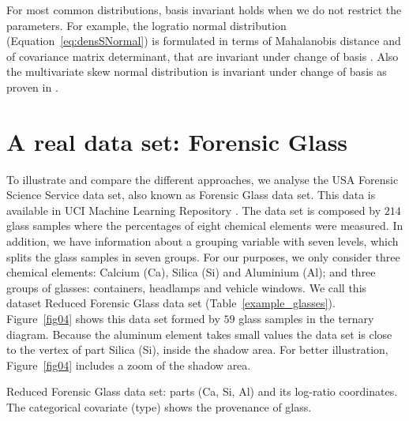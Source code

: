 \documentclass[12pt, a4paper]{article}
\begin{document}
For most common distributions, basis invariant holds when we do not restrict the parameters. For example, the logratio normal distribution (Equation~\ref{eq:densSNormal}) is formulated in terms of Mahalanobis distance and of covariance matrix determinant, that are invariant under change of basis  \citep{barcelo1999comment}. Also the multivariate skew normal distribution is invariant under change of basis as proven in \cite{azzalini1999statistical}.

\section{A real data set: Forensic Glass}
\label{example_section}

\noindent To illustrate and compare the different approaches, we analyse the USA Forensic Science Service data set, also known as Forensic Glass data set. This data is available in UCI Machine Learning Repository \citep{uci2007repository}.  The data set is composed by  $214$ glass samples where the percentages of eight chemical elements were measured. In addition, we have information about a grouping variable with seven levels, which splits the glass samples in seven groups. For our purposes, we only consider three chemical elements: Calcium (Ca), Silica (Si) and Aluminium (Al); and three groups of glasses: containers, headlamps and vehicle windows. We call this dataset Reduced Forensic Glass data set (Table~\ref{example_glasses}). Figure~\ref{fig04} shows this data set formed by $59$ glass samples in the ternary diagram. Because the aluminum element takes small values the data set is close to the vertex of part Silica (Si), inside the shadow area. For better illustration, Figure~\ref{fig04} includes a zoom of the shadow area.


\begin{table}
\centering
\scriptsize


%
\caption{Reduced Forensic Glass data set: parts (Ca, Si, Al) and its log-ratio coordinates. 
The categorical covariate  (type) shows the provenance of glass.}
\label{example_glasses}
\end{table}

% 
% 
\end{document}
